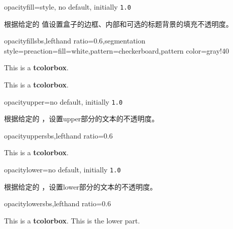 \begin{docTcbKey}{opacityfill}{=}{style, no default, initially \texttt{1.0}}

根据给定的  值设置盒子的边框、内部和可选的标题背景的填充不透明度。
\begin{exdispExample*}{opacityfill}{sbs,lefthand ratio=0.6,segmentation style={preaction={fill=white},pattern=checkerboard,pattern color=gray!40}}
\begin{tcolorbox}[standard jigsaw,colframe=red,
  opacityfill=0.7, title=This is a title]
This is a \textbf{tcolorbox}.
\end{tcolorbox}
\begin{tcolorbox}[standard jigsaw,colframe=red,
title=This is a title]
This is a \textbf{tcolorbox}.
\end{tcolorbox}
\end{exdispExample*}
\end{docTcbKey}





\begin{docTcbKey}{opacityupper}{=}{no default, initially \texttt{1.0}}

根据给定的 ，设置upper部分的文本的不透明度。
\begin{exdispExample*}{opacityupper}{sbs,lefthand ratio=0.6}
\begin{tcolorbox}[enhanced,opacityupper=0.5
  ,interior style={preaction={fill=white}
  ,pattern=checkerboard
  ,pattern color=gray!40}]
This is a \textbf{tcolorbox}.
\end{tcolorbox}
\end{exdispExample*}
\end{docTcbKey}



\begin{docTcbKey}{opacitylower}{=}{no default, initially \texttt{1.0}}

根据给定的 ，设置lower部分的文本的不透明度。
\begin{exdispExample*}{opacitylower}{sbs,lefthand ratio=0.6}
\begin{tcolorbox}[enhanced,opacitylower=0.5,
  interior style={preaction={fill=white},pattern=checkerboard,pattern color=gray!40}]
This is a \textbf{tcolorbox}.
\tcblower
This is the lower part.
\end{tcolorbox}
\end{exdispExample*}
\end{docTcbKey}

